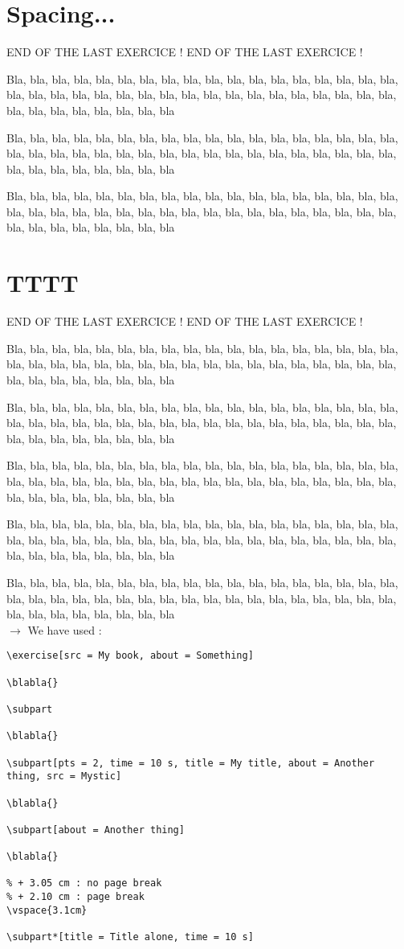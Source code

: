 \documentclass[12pt]{article}
\newcommand\blabla{%
		\noindent Bla, bla, bla, bla, bla, bla, bla, bla, bla, bla, bla,
		bla, bla, bla, bla, bla, bla, bla, bla, bla, bla, bla,
		bla, bla, bla, bla, bla, bla, bla, bla, bla, bla, bla,
		bla, bla, bla, bla, bla, bla, bla, bla, bla, bla, bla
	}
\newcommand\codeused{
		\blabla{} \medskip  \\ \noindent $\rightarrow$ We have used :
	}
\begin{document}
\newpage\section{Spacing...}

\noindent END OF THE LAST EXERCICE ! END OF THE LAST EXERCICE !

\exercise

\blabla{}

\subpart[title=Un long titre pour bien tester...]

\blabla{}


\exercise

\subpart[title=Un long titre pour bien tester...]

\blabla{}



\newpage\section{TTTT}

\noindent END OF THE LAST EXERCICE ! END OF THE LAST EXERCICE !

\exercise[src = My book, about = Something]
      
\blabla{}

\subpart

\blabla{}

\subpart[pts = 2, time = 10 s, title = My title, about = Another thing, src = Mystic]

\blabla{}

\subpart[about = Another thing]

\blabla{}


\subpart*[title = Title alone, time = 10 s]


\codeused{}

\begin{verbatim}
\exercise[src = My book, about = Something]
      
\blabla{}

\subpart

\blabla{}

\subpart[pts = 2, time = 10 s, title = My title, about = Another thing, src = Mystic]

\blabla{}

\subpart[about = Another thing]

\blabla{}

% + 3.05 cm : no page break
% + 2.10 cm : page break
\vspace{3.1cm}

\subpart*[title = Title alone, time = 10 s]\end{verbatim}
\end{document}
